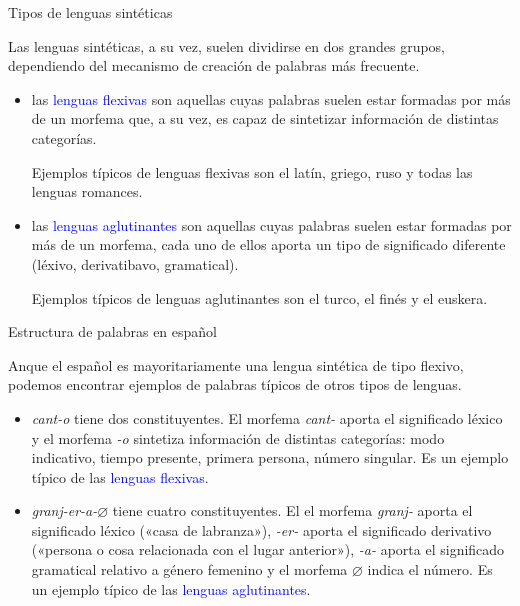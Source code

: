 \documentclass[handout]{beamer}
\begin{document}
\begin{frame}{Tipos de lenguas sintéticas}

Las lenguas sintéticas, a su vez, suelen dividirse en dos grandes grupos, dependiendo del mecanismo de creación de palabras más frecuente.

\begin{itemize}
	\item las \textcolor{blue}{lenguas flexivas} son aquellas cuyas palabras suelen estar formadas por más de un morfema que, a su vez, es capaz de sintetizar información de distintas categorías. 
	
	Ejemplos típicos de lenguas flexivas son el latín, griego, ruso y todas las lenguas romances.
	
	\item las \textcolor{blue}{lenguas aglutinantes} son aquellas cuyas palabras suelen estar formadas por más de un morfema, cada uno de ellos aporta un tipo de significado diferente (léxivo, derivatibavo, gramatical). 

	Ejemplos típicos de lenguas aglutinantes son el turco, el finés y el euskera.

\end{itemize}
\end{frame}

\begin{frame}{Estructura de palabras en español}

Anque el español es mayoritariamente una lengua sintética de tipo flexivo, podemos encontrar ejemplos de palabras típicos de otros tipos de lenguas.

\begin{itemize}
	\item \textit{cant-o} tiene dos constituyentes. El morfema \textit{cant-} aporta el significado léxico y el morfema \textit{-o} sintetiza información de distintas categorías: modo indicativo, tiempo presente, primera persona, número singular. Es un ejemplo típico de las \textcolor{blue}{lenguas flexivas}.

	\item \textit{granj-er-a-$\varnothing$} tiene cuatro constituyentes. El el morfema \textit{granj-} aporta el significado léxico («casa de labranza»), \textit{-er-} aporta el significado derivativo («persona o cosa relacionada con el lugar anterior»), \textit{-a-} aporta el significado gramatical relativo a género femenino y el morfema $\varnothing$ indica el número. Es un ejemplo típico de las \textcolor{blue}{lenguas aglutinantes}.

\end{itemize}
\end{frame}
\end{document}
